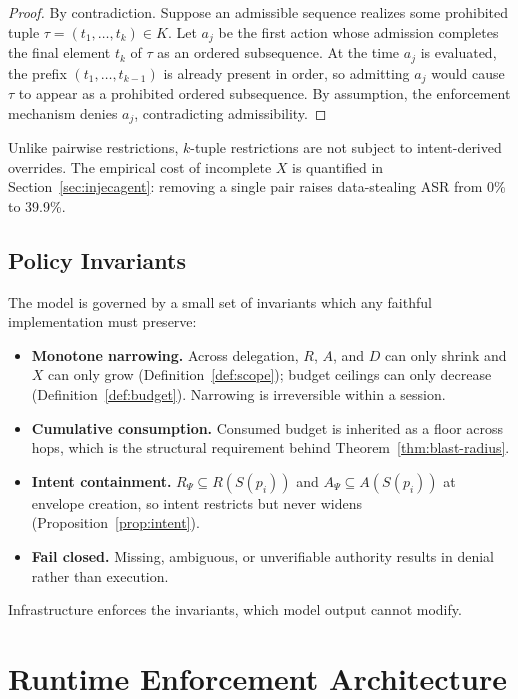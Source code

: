 \documentclass[sigconf,nonacm]{acmart}
\begin{document}
\begin{proof}
By contradiction. Suppose an admissible sequence realizes some prohibited tuple $\tau = (t_1,\dots,t_k) \in K$. Let $a_j$ be the first action whose admission completes the final element $t_k$ of $\tau$ as an ordered subsequence. At the time $a_j$ is evaluated, the prefix $(t_1,\dots,t_{k-1})$ is already present in order, so admitting $a_j$ would cause $\tau$ to appear as a prohibited ordered subsequence. By assumption, the enforcement mechanism denies $a_j$, contradicting admissibility.
\end{proof}

\noindent Unlike pairwise restrictions, $k$-tuple restrictions are not subject to intent-derived overrides. The empirical cost of incomplete $X$ is quantified in Section~\ref{sec:injecagent}: removing a single pair raises data-stealing ASR from 0\% to 39.9\%.

\subsection{Policy Invariants}\label{sec:invariants}

The model is governed by a small set of invariants which any faithful implementation must preserve:
\begin{itemize}
\item \textbf{Monotone narrowing.} Across delegation, $R$, $A$, and $D$ can only shrink and $X$ can only grow (Definition~\ref{def:scope}); budget ceilings can only decrease (Definition~\ref{def:budget}). Narrowing is irreversible within a session.
\item \textbf{Cumulative consumption.} Consumed budget is inherited as a floor across hops, which is the structural requirement behind Theorem~\ref{thm:blast-radius}.
\item \textbf{Intent containment.} $R_\Psi \subseteq R(S(p_i))$ and $A_\Psi \subseteq A(S(p_i))$ at envelope creation, so intent restricts but never widens (Proposition~\ref{prop:intent}).
\item \textbf{Fail closed.} Missing, ambiguous, or unverifiable authority results in denial rather than execution.
\end{itemize}
Infrastructure enforces the invariants, which model output cannot modify.

\section{Runtime Enforcement Architecture}\label{sec:enforcement}
\end{document}
